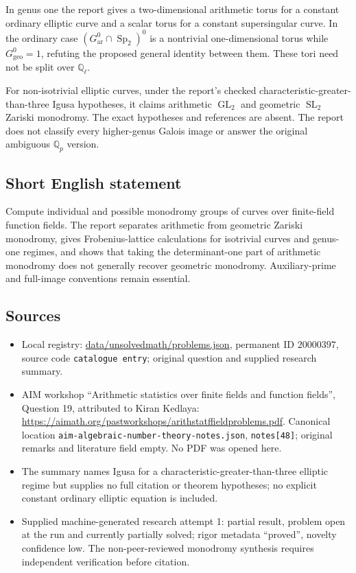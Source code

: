 \documentclass[11pt]{article}
\newcommand{\Q}{\mathbb{Q}}
\begin{document}
In genus one the report gives a two-dimensional arithmetic torus for a constant ordinary elliptic curve and a scalar torus for a constant supersingular curve. In the ordinary case $(G_{\mathrm{ar}}^0\cap\operatorname{Sp}_2)^0$ is a nontrivial one-dimensional torus while $G_{\mathrm{geo}}^0=1$, refuting the proposed general identity between them. These tori need not be split over $\Q_\ell$.

For non-isotrivial elliptic curves, under the report's checked characteristic-greater-than-three Igusa hypotheses, it claims arithmetic $\operatorname{GL}_2$ and geometric $\operatorname{SL}_2$ Zariski monodromy. The exact hypotheses and references are absent. The report does not classify every higher-genus Galois image or answer the original ambiguous $\Q_p$ version.
\subsection{Short English statement}
Compute individual and possible monodromy groups of curves over finite-field function fields. The report separates arithmetic from geometric Zariski monodromy, gives Frobenius-lattice calculations for isotrivial curves and genus-one regimes, and shows that taking the determinant-one part of arithmetic monodromy does not generally recover geometric monodromy. Auxiliary-prime and full-image conventions remain essential.
\subsection{Sources}
\begin{itemize}
\item Local registry: \url{data/unsolvedmath/problems.json}, permanent ID $20000397$, source code \texttt{catalogue entry}; original question and supplied research summary.
\item AIM workshop ``Arithmetic statistics over finite fields and function fields'', Question 19, attributed to Kiran Kedlaya: \url{https://aimath.org/pastworkshops/arithstatffieldproblems.pdf}. Canonical location \texttt{aim-algebraic-number-theory-notes.json}, \texttt{notes[48]}; original remarks and literature field empty. No PDF was opened here.
\item The summary names Igusa for a characteristic-greater-than-three elliptic regime but supplies no full citation or theorem hypotheses; no explicit constant ordinary elliptic equation is included.
\item Supplied machine-generated research attempt 1: partial result, problem open at the run and currently partially solved; rigor metadata ``proved'', novelty confidence low. The non-peer-reviewed monodromy synthesis requires independent verification before citation.
\end{itemize}
\end{document}
